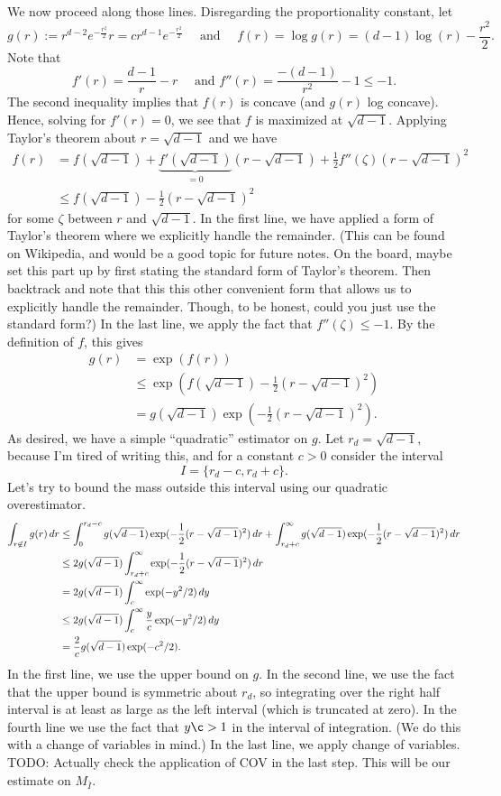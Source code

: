We now proceed along those lines. 
Disregarding the proportionality constant, let 
$$
g(r) := r^{d - 2}e^{-\frac{r^2}{2}}r = cr^{d-1}e^{-\frac{r^2}{2}} \quad \mbox{ and } \quad f(r) = \log g(r) = (d-1) \log(r) - \frac{r^2}{2}.
$$
Note that 
$$
f'(r) = \frac{d-1}{r} - r \quad \mbox{ and } f''(r) = \frac{-(d-1)}{r^2} - 1 \leq -1.
$$
The second inequality implies that $f(r)$ is concave (and $g(r)$ log concave). Hence, solving for $f'(r) = 0$, we see that $f$ is maximized at $\sqrt{d-1}$. Applying Taylor's theorem about $r=\sqrt{d-1}$ and we have
\begin{align}
\label{eq:gauss-sphere-f-taylor}
f(r) & = f(\sqrt{d-1}) + \underbrace{f'(\sqrt{d-1})}_{=0}(r-\sqrt{d-1}) + \frac{1}{2}f''(\zeta)(r-\sqrt{d-1})^2\\ 
& \leq f(\sqrt{d-1}) - \frac{1}{2}(r-\sqrt{d-1})^2
\end{align}
for some $\zeta$ between $r$ and $\sqrt{d-1}$. In the first line, we have applied a form of Taylor's theorem where we explicitly handle the remainder. (This can be found on Wikipedia, and would be a good topic for future notes. On the board, maybe set this part up by first stating the standard form of Taylor's theorem. Then backtrack and note that this this other convenient form that allows us to explicitly handle the remainder. Though, to be honest, could you just use the standard form?) In the last line, we apply the fact that $f''(\zeta) \leq -1$. 
By the definition of $f$, this gives
\begin{align}
g(r) & = \exp(f(r)) \\
& \leq \exp(f(\sqrt{d-1}) - \frac{1}{2}(r-\sqrt{d-1})^2 )\\
&  = g(\sqrt{d-1})\exp(-\frac{1}{2}(r-\sqrt{d-1})^2 ).
\end{align}
As desired, we have a simple ``quadratic'' estimator on $g$. Let $r_d = \sqrt{d-1}$, because I'm tired of writing this, and for a constant $c>0$ consider the interval 
$$
I = \{r_d - c, r_d+c\}. 
$$
Let's try to bound the mass outside this interval using our quadratic overestimator. 
\begin{align}
\int_{r\not\in I} g(r)\, dr & \leq \int_0^{r_d - c} g(\sqrt{d-1})\exp(-\frac{1}{2}(r-\sqrt{d-1})^2 ) \, dr + \int _{r_d+c}^{\infty} g(\sqrt{d-1})\exp(-\frac{1}{2}(r-\sqrt{d-1})^2 )\, dr\\
& \leq 2g(\sqrt{d-1})\int _{r_d+c}^{\infty} \exp(-\frac{1}{2}(r-\sqrt{d-1})^2 )\, dr\\
& = 2g(\sqrt{d-1})\int _{c}^{\infty} \exp(-y^2/2)\, dy\\
& \leq 2g(\sqrt{d-1}) \int _{c}^{\infty} \frac{y}{c}\exp(-y^2/2)\, dy\\
& = \frac{2}{c}g(\sqrt{d-1})\exp(-c^2/2).
\end{align}
In the first line, we use the upper bound on $g$. In the second line, we use the fact that the upper bound is symmetric about $r_d$, so integrating over the right half interval is at least as large as the left interval (which is truncated at zero). 
In the fourth line we use the fact that $y\c > 1$ in the interval of integration. (We do this with a change of variables in mind.) In the last line, we apply change of variables. TODO: Actually check the application of COV in the last step. This will be our estimate on $M_{\bar I}$. 

